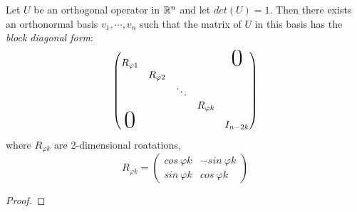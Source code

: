 \begin{theorem}
Let $U$ be an orthogonal operator in $\mathbb{R}^{n}$ and let $det(U) = 1$. Then there exists an orthonormal basis $v_{1}, \cdots, v_{n}$ such that the matrix of $U$ in this basis has the \textit{block diagonal form}:
$$\begin{pmatrix}
R_{\varphi 1} & & & & \makebox{\Huge 0} \\
 & R_{\varphi 2} & & & \\ 
 & & \ddots & & \\
 & & & R_{\varphi k} & \\
 \makebox{\Huge 0} & & & & I_{n - 2k}
\end{pmatrix}$$
where $R_{\varphi k}$ are 2-dimensional roatations, 
$$R_{\varphi k} = \begin{pmatrix}
cos \ \varphi k & -sin \  \varphi k \\
sin \ \varphi k & cos \ \varphi k
\end{pmatrix}$$
\end{theorem}

\begin{proof}

\end{proof}